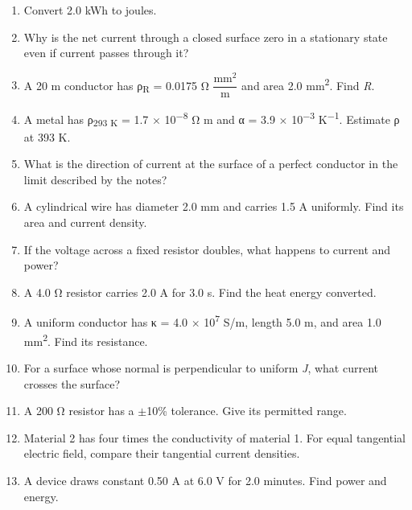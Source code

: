 \documentclass[11pt]{article}
\begin{document}
\begin{keepsection}
\begin{enumerate}
\item Convert 2.0 kWh to joules.
\item Why is the net current through a closed surface zero in a stationary state even if current passes through it?
\item A 20 m conductor has ρ\textsubscript{R} = 0.0175 Ω {\small\ensuremath{\dfrac{\text{mm}^{2}}{\mathrm{m}}}} and area 2.0 mm\textsuperscript{2}. Find \textit{R}.
\item A metal has ρ\textsubscript{293 K} = 1.7 \ensuremath{\times} 10\textsuperscript{\ensuremath{-}8} Ω m and α = 3.9 \ensuremath{\times} 10\textsuperscript{\ensuremath{-}3} K\textsuperscript{\ensuremath{-}1}. Estimate ρ at 393 K.
\item What is the direction of current at the surface of a perfect conductor in the limit described by the notes?
\item A cylindrical wire has diameter 2.0 mm and carries 1.5 A uniformly. Find its area and current density.
\item If the voltage across a fixed resistor doubles, what happens to current and power?
\item A 4.0 Ω resistor carries 2.0 A for 3.0 s. Find the heat energy converted.
\item A uniform conductor has κ = 4.0 \ensuremath{\times} 10\textsuperscript{7} S/m, length 5.0 m, and area 1.0 mm\textsuperscript{2}. Find its resistance.
\item For a surface whose normal is perpendicular to uniform \textit{J}, what current crosses the surface?
\item A 200 Ω resistor has a \ensuremath{\pm}10\% tolerance. Give its permitted range.
\item Material 2 has four times the conductivity of material 1. For equal tangential electric field, compare their tangential current densities.
\item A device draws constant 0.50 A at 6.0 V for 2.0 minutes. Find power and energy.
\end{enumerate}

\end{keepsection}
\end{document}

